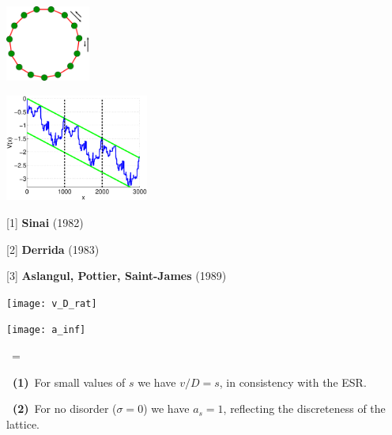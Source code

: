 \documentclass[12pt,fleqn]{seminar}
\begin{document}
\smp{0.45\hsize}

\hspace*{1cm}
\includegraphics[height=25mm]{sparse_network2.eps}

\includegraphics[height=3.5cm]{V_x}

\Dn[2]

[1] {\bf Sinai} (1982)

[2] {\bf Derrida} (1983)

[3] {\bf Aslangul, Pottier, Saint-James}  (1989)

\Dn[2]


\emp


\esl



\bslC


\bmp{0.5\hsize}


\texttt{[image: v\_D\_rat]}

\smp{0.5\hsize}


\texttt{[image: a\_inf]}


\emp

\be
\hspace{1cm}  \hspace{2cm}   \ = \  \tanh {}
\ee

{\bf \ (1)}~For small values of $s$ we have ${v/D=s}$, in consistency with the ESR. 

%
{\bf \ (2)}~For no disorder ($\sigma=0$) we have ${a_s=1}$, reflecting the discreteness of the lattice. 
%
\end{document}
